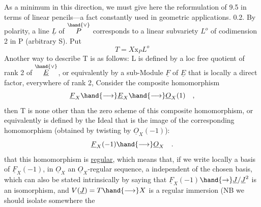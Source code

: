 
As a minimum in this direction, we must give here the reformulation of 9.5
in terms of linear pencils—a fact constantly used in geometric
applications.
0.2. By polarity, a line $\underline{L}$ of $\overset{\hand{\vee}}{P}$ corresponds to a linear
subvariety $L^{o}$ of codimension 2 in P (arbitrary S). Put
\[ T = X\mathrm{x}_{P}L^{o} \]
Another way to describe T is as follows: L is defined by a
loc free quotient of rank 2 of $\overset{\hand{\vee}}{\underline{E}}$, or equivalently by a
sub-Module $\underline{F}$ of $\underline{E}$ that is locally a direct factor, everywhere of rank 2,
Consider the composite homomorphism
\[ \underline{F}_{X} \hand{\longrightarrow} \underline{E}_{X} \hand{\longrightarrow} \underline{O}_{X}(1) \quad , \]
then T is none other than the zero scheme of this composite
homomorphism, or equivalently is defined by the Ideal  that is the image of the corresponding
homomorphism (obtained by twisting by $\underline{O}_{X}(-1)$):
\[ \underline{F}_{X}(-1) \hand{\longrightarrow} \underline{O}_{X} \quad . \]
 that this homomorphism is \uline{regular}, which means
that, if we write locally a  basis of $\underline{F}_{X}(-1)$,    in $\underline{O}_{X}$\hand{\unsure{$\curvearrowleft$|$\widehat{\ }$}}
 an $\underline{O}_{X}$-regular sequence, a  independent of the
chosen basis, which can also be stated intrinsically by saying that
$\underline{F}_{X}(-1)$$\hand{\to} \underline{J}/\underline{J}^{2}$ is an isomorphism, and $V(\underline{J})=T \hand{\longrightarrow} X$ is a regular
 immersion (NB we  should isolate somewhere the
